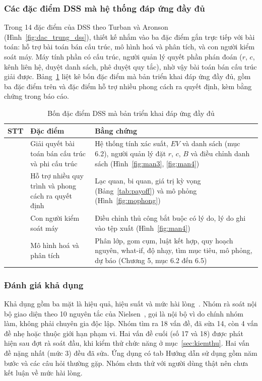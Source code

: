\subsubsection{Các đặc điểm DSS mà hệ thống đáp ứng đầy đủ}
Trong 14 đặc điểm của DSS theo Turban và Aronson~\cite{turban2005} (Hình~\ref{fig:dac_trung_dss}), thiết kế nhắm vào ba đặc điểm gắn trực tiếp với bài toán: hỗ trợ bài toán bán cấu trúc, mô hình hoá và phân tích, và con người kiểm soát máy. Máy tính phần có cấu trúc, người quản lý quyết phần phán đoán ($r$, $c$, kênh liên hệ, duyệt danh sách, phê duyệt quy tắc), nhờ vậy bài toán bán cấu trúc giải được. Bảng~\ref{tab:dacdiem} liệt kê bốn đặc điểm mà bản triển khai đáp ứng đầy đủ, gồm ba đặc điểm trên và đặc điểm hỗ trợ nhiều phong cách ra quyết định, kèm bằng chứng trong báo cáo.

\begin{table}[!htbp]
\centering
\caption{Bốn đặc điểm DSS mà bản triển khai đáp ứng đầy đủ}
\label{tab:dacdiem}
\footnotesize
\renewcommand{\arraystretch}{1.1}
\begin{tabular}{>{\raggedright\arraybackslash}p{0.6cm}>{\raggedright\arraybackslash}p{4.6cm}>{\raggedright\arraybackslash}p{9.4cm}}
\toprule
STT & Đặc điểm & Bằng chứng \\
\midrule
1 & Giải quyết bài toán bán cấu trúc và phi cấu trúc & Hệ thống tính xác suất, $EV$ và danh sách (mục 6.2), người quản lý đặt $r$, $c$, $B$ và điều chỉnh danh sách (Hình~\ref{fig:man3}, \ref{fig:man4}) \\
6 & Hỗ trợ nhiều quy trình và phong cách ra quyết định & Lạc quan, bi quan, giá trị kỳ vọng (Bảng~\ref{tab:payoff}) và mô phỏng (Hình~\ref{fig:mophong}) \\
10 & Con người kiểm soát máy & Điều chỉnh thủ công bắt buộc có lý do, lý do ghi vào tệp xuất (Hình~\ref{fig:man4}) \\
12 & Mô hình hoá và phân tích & Phân lớp, gom cụm, luật kết hợp, quy hoạch nguyên, what-if, độ nhạy, tìm mục tiêu, mô phỏng, dự báo (Chương 5, mục 6.2 đến 6.5) \\
\bottomrule
\end{tabular}
\end{table}

\subsubsection{Đánh giá khả dụng}\label{sec:nielsen}
Khả dụng gồm ba mặt là hiệu quả, hiệu suất và mức hài lòng~\cite{iso9241}. Nhóm rà soát nội bộ giao diện theo 10 nguyên tắc của Nielsen~\cite{nielsen1994}, gọi là nội bộ vì do chính nhóm làm, không phải chuyên gia độc lập. Nhóm tìm ra 18 vấn đề, đã sửa 14, còn 4 vấn đề nhẹ hoặc thuộc giới hạn phạm vi. Hai vấn đề cuối (số 17 và 18) được phát hiện sau đợt rà soát đầu, khi kiểm thử chức năng ở mục~\ref{sec:kiemthu}. Hai vấn đề nặng nhất (mức 3) đều đã sửa. Ứng dụng có tab Hướng dẫn sử dụng gồm năm bước và các câu hỏi thường gặp. Nhóm chưa thử với người dùng thật nên chưa kết luận về mức hài lòng.


